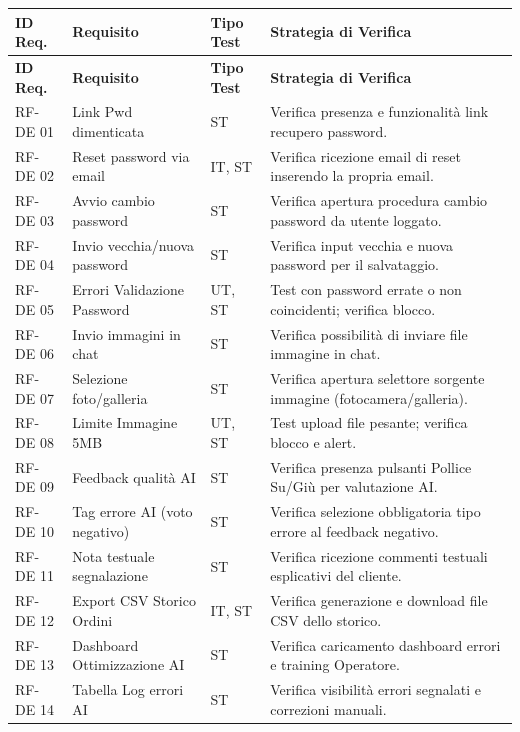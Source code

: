 \documentclass[a4paper,11pt,oneside]{scrartcl}
\begin{document}
\begin{longtable}{|p{1.5cm}|p{5.5cm}|p{1.8cm}|p{5cm}|}
\hline
\textbf{ID Req.} & \textbf{Requisito} & \textbf{Tipo Test} & \textbf{Strategia di Verifica} \\
\hline
\endfirsthead
\hline
\textbf{ID Req.} & \textbf{Requisito} & \textbf{Tipo Test} & \textbf{Strategia di Verifica} \\
\hline
\endhead

RF-DE 01 & Link Pwd dimenticata & ST & Verifica presenza e funzionalità link recupero password. \\ \hline
RF-DE 02 & Reset password via email & IT, ST & Verifica ricezione email di reset inserendo la propria email. \\ \hline
RF-DE 03 & Avvio cambio password & ST & Verifica apertura procedura cambio password da utente loggato. \\ \hline
RF-DE 04 & Invio vecchia/nuova password & ST & Verifica input vecchia e nuova password per il salvataggio. \\ \hline
RF-DE 05 & Errori Validazione Password & UT, ST & Test con password errate o non coincidenti; verifica blocco. \\ \hline
RF-DE 06 & Invio immagini in chat & ST & Verifica possibilità di inviare file immagine in chat. \\ \hline
RF-DE 07 & Selezione foto/galleria & ST & Verifica apertura selettore sorgente immagine (fotocamera/galleria). \\ \hline
RF-DE 08 & Limite Immagine 5MB & UT, ST & Test upload file pesante; verifica blocco e alert. \\ \hline
RF-DE 09 & Feedback qualità AI & ST & Verifica presenza pulsanti Pollice Su/Giù per valutazione AI. \\ \hline
RF-DE 10 & Tag errore AI (voto negativo) & ST & Verifica selezione obbligatoria tipo errore al feedback negativo. \\ \hline
RF-DE 11 & Nota testuale segnalazione & ST & Verifica ricezione commenti testuali esplicativi del cliente. \\ \hline
RF-DE 12 & Export CSV Storico Ordini & IT, ST & Verifica generazione e download file CSV dello storico. \\ \hline
RF-DE 13 & Dashboard Ottimizzazione AI & ST & Verifica caricamento dashboard errori e training Operatore. \\ \hline
RF-DE 14 & Tabella Log errori AI & ST & Verifica visibilità errori segnalati e correzioni manuali. \\ \hline

\end{longtable}
\end{document}

